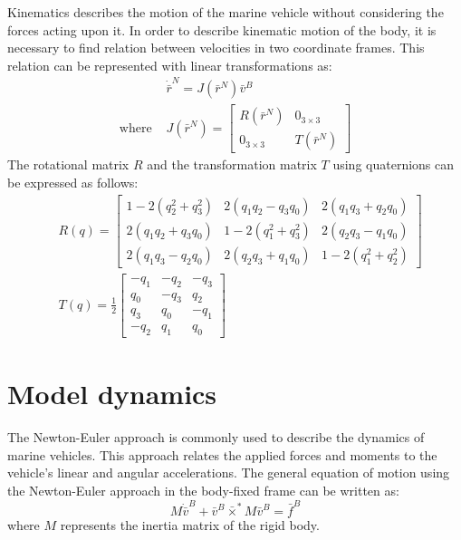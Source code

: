     Kinematics describes the motion of the marine vehicle without considering the forces acting upon it.
    In order to describe kinematic motion of the body, it is necessary to find relation between velocities in two coordinate frames.
    This relation can be represented with linear transformations as:
    $$
    \begin{aligned}
        & \dot{\bar{r}}^N=J(\bar{r}^N) \bar{v}^B \\
        \text{where } & J(\bar{r}^N)=\left[\begin{array}{cc}
        R(\bar{r}^N) & 0_{3 \times 3} \\
        0_{3 \times 3} & T(\bar{r}^N)
        \end{array}\right]
    \end{aligned}
    $$
    The rotational matrix $R$ and the transformation matrix $T$ using quaternions can be expressed as follows:
    $$
    \begin{aligned}
    & R(q)=\left[\begin{array}{ccc}
        1-2\left(q_2^2+q_3^2\right) & 2\left(q_1 q_2-q_3 q_0\right) & 2\left(q_1 q_3+q_2 q_0\right) \\
        2\left(q_1 q_2+q_3 q_0\right) & 1-2\left(q_1^2+q_3^2\right) & 2\left(q_2 q_3-q_1 q_0\right) \\
        2\left(q_1 q_3-q_2 q_0\right) & 2\left(q_2 q_3+q_1 q_0\right) & 1-2\left(q_1^2+q_2^2\right)
        \end{array}\right]\\
    & T(q)=\frac{1}{2}\left[\begin{array}{rrr}
        -q_1 & -q_2 & -q_3 \\
        q_0 & -q_3 & q_2 \\
        q_3 & q_0 & -q_1 \\
        -q_2 & q_1 & q_0
        \end{array}\right]
    \end{aligned}
    $$

\section{Model dynamics}

    The Newton-Euler approach is commonly used to describe the dynamics of marine vehicles.
    This approach relates the applied forces and moments to the vehicle's linear and angular accelerations.
    The general equation of motion using the Newton-Euler approach in the body-fixed frame can be written as:
    $$
    M\dot{\bar{v}}^B+\bar{v}^B\bar{\times}^*M\bar{v}^B=\bar{f}^B
    $$
    where $M$ represents the inertia matrix of the rigid body.

